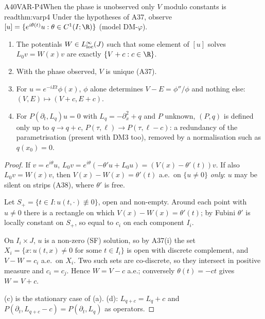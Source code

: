 \begin{dimcard}{A40}{VAR-P4}{When the phase is unobserved only $V$ modulo constants is read}{\proved}{thm:varp4}
Under the hypotheses of A37, observe $[u]=\{e^{i\theta(t)}u:\theta\in C^1(I;\R)\}$ (model DM-$\varphi$).
\begin{enumerate}[label=(\alph*)]
\item The potentials $W\in L^\infty_{\rm loc}(J)$ such that some element of $[u]$ solves $L_0v=W(x)v$ are exactly $\{V+c:c\in\R\}$.
\item With the phase observed, $V$ is unique (A37).
\item For $u=e^{-iEt}\phi(x)$, $\phi$ alone determines $V-E=\phi''/\phi$ and nothing else: $(V,E)\mapsto(V+c,E+c)$.
\item For $P(\partial_t,L_q)u=0$ with $L_q=-\partial_x^2+q$ and $P$ unknown, $(P,q)$ is defined only up to $q\to q+c$, $P(\tau,\ell)\to P(\tau,\ell-c)$: a redundancy of the parametrisation (present with DM3 too), removed by a normalisation such as $q(x_0)=0$.
\end{enumerate}
\end{dimcard}

\begin{proof}
If $v=e^{i\theta}u$, $L_0v=e^{i\theta}(-\theta'u+L_0u)=(V(x)-\theta'(t))v$. If also $L_0v=W(x)v$, then $V(x)-W(x)=\theta'(t)$ a.e.\ on $\{u\ne0\}$ \emph{only}: $u$ may be silent on strips (A38), where $\theta'$ is free.

Let $S_+=\{t\in I:u(t,\cdot)\not\equiv0\}$, open and non-empty. Around each point with $u\ne0$ there is a rectangle on which $V(x)-W(x)=\theta'(t)$; by Fubini $\theta'$ is locally constant on $S_+$, so equal to $c_i$ on each component $I_i$.

On $I_i\times J$, $u$ is a non-zero (SF) solution, so by A37(i) the set $X_i=\{x:u(t,x)\ne0\text{ for some }t\in I_i\}$ is open with discrete complement, and $V-W=c_i$ a.e.\ on $X_i$. Two such sets are co-discrete, so they intersect in positive measure and $c_i=c_j$. Hence $W=V-c$ a.e.; conversely $\theta(t)=-ct$ gives $W=V+c$.

(c) is the stationary case of (a). (d): $L_{q+c}=L_q+c$ and $P(\partial_t,L_{q+c}-c)=P(\partial_t,L_q)$ as operators.

\end{proof}
